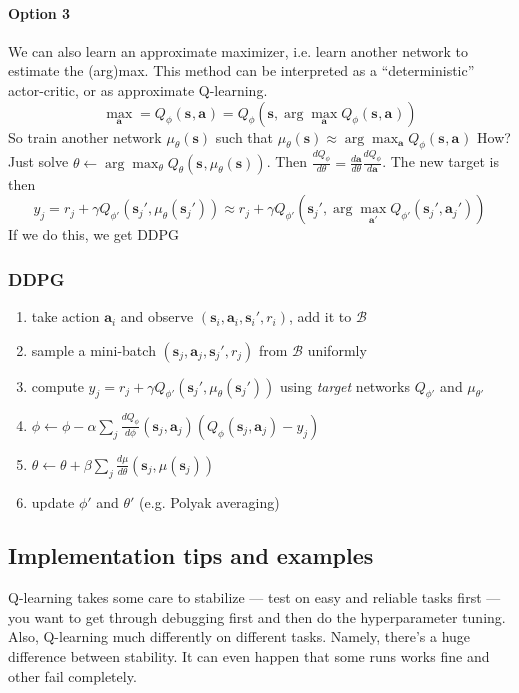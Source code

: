 \documentclass{report}
\newcommand{\argmax}{\arg\!\max}
\begin{document}
\paragraph{Option 3}
We can also learn an approximate maximizer, i.e. learn another network to estimate the (arg)max.
This method can be interpreted as a ``deterministic'' actor-critic,
or as approximate Q-learning.
\begin{equation}
		\max_{\bm{a}}= Q_\phi(\bm{s}_{}, \bm{a}_{})= Q_\phi(\bm{s}, \argmax_{\bm{a}} Q_\phi(\bm{s}_{}, \bm{a}_{}))
\end{equation}
So train another network $\mu_\theta(\bm{s})$ such that $\mu_\theta(\bm{s}) \approx \argmax_{\bm{a}} Q_\phi(\bm{s}_{}, \bm{a}_{})$
How? Just solve $\theta \leftarrow \argmax_{\theta} Q_\theta(\bm{s}_{}, \mu_\theta (\bm{s}))$.
Then $ \frac{d Q_\phi}{d\theta} = \frac{d\bm{a}}{d\theta} \frac{dQ_\phi}{d\bm{a}}    $.
The new target is then
\begin{equation}
		y_j = r_j + \gamma Q_{\phi'}(\bm{s}_j', \mu_\theta (\bm{s}_j')) \approx
		r_j + \gamma Q_{\phi'} (\bm{s}_{j}', \argmax_{\bm{a}'}Q_{\phi'} (\bm{s}_{j}', \bm{a}_{j}'))
\end{equation}
If we do this, we get DDPG
\subsubsection{DDPG}
\begin{enumerate}
		\item take action $\bm{a}_i$ and observe $\left( \bm{s}_i, \bm{a}_i, \bm{s}_i', r_i \right)  $, add it to $\mathcal{B}$
		\item sample a mini-batch  $\left( \bm{s}_j, \bm{a}_j, \bm{s}_j', r_j \right)$  from $\mathcal{B}$ uniformly
		\item compute $y_j = r_j + \gamma Q_{\phi'}(\bm{s}_j', \mu_\theta (\bm{s}_j'))$ using \textit{target} networks $Q_{\phi'}$ and $\mu_{\theta'}$
		\item $\phi \leftarrow \phi  - \alpha \sum_{j}^{}  \frac{d Q_\phi}{d\phi} (\bm{s}_{j}, \bm{a}_{j}) \left( Q_\phi(\bm{s}_{j}, \bm{a}_{j}) - 
				y_j 	\right)$
		\item $\theta \leftarrow \theta + \beta \sum_{j}^{} \frac{d\mu}{d\theta} (\bm{s}_j, \mu(\bm{s}_j))$
		\item update $\phi'$ and $\theta'$ (e.g. Polyak averaging)
\end{enumerate}

\subsection{Implementation tips and examples}
Q-learning takes some care to stabilize --- test on easy and reliable tasks first --- you want to get through debugging first and then do the hyperparameter tuning.
Also, Q-learning much differently on different tasks. Namely, there's a huge difference between stability. It can even happen that some runs works fine
and other fail completely.
\end{document}
